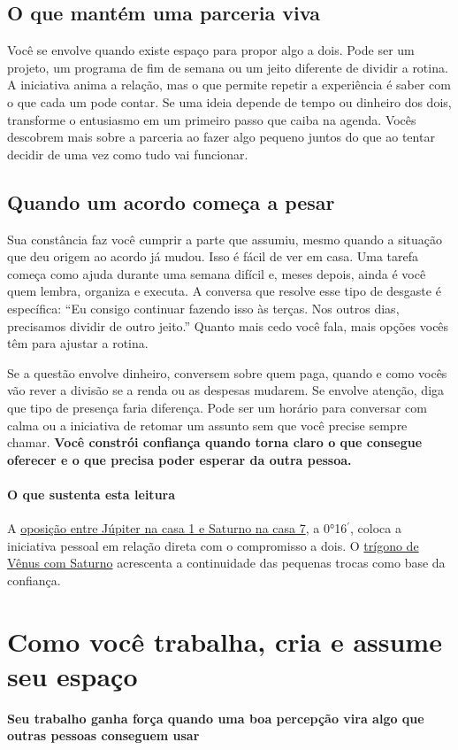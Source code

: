 \documentclass[11pt,a4paper]{article}
\newcommand{\subtituloleitura}[1]{\textbf{#1}\par\nopagebreak[4]}
\begin{document}
\subsection*{O que mantém uma parceria viva}

Você se envolve quando existe espaço para propor algo a dois. Pode ser um projeto, um programa de fim de semana ou um jeito diferente de dividir a rotina. A iniciativa anima a relação, mas o que permite repetir a experiência é saber com o que cada um pode contar. Se uma ideia depende de tempo ou dinheiro dos dois, transforme o entusiasmo em um primeiro passo que caiba na agenda. Vocês descobrem mais sobre a parceria ao fazer algo pequeno juntos do que ao tentar decidir de uma vez como tudo vai funcionar.

\subsection*{Quando um acordo começa a pesar}

Sua constância faz você cumprir a parte que assumiu, mesmo quando a situação que deu origem ao acordo já mudou. Isso é fácil de ver em casa. Uma tarefa começa como ajuda durante uma semana difícil e, meses depois, ainda é você quem lembra, organiza e executa. A conversa que resolve esse tipo de desgaste é específica: “Eu consigo continuar fazendo isso às terças. Nos outros dias, precisamos dividir de outro jeito.” Quanto mais cedo você fala, mais opções vocês têm para ajustar a rotina.

Se a questão envolve dinheiro, conversem sobre quem paga, quando e como vocês vão rever a divisão se a renda ou as despesas mudarem. Se envolve atenção, diga que tipo de presença faria diferença. Pode ser um horário para conversar com calma ou a iniciativa de retomar um assunto sem que você precise sempre chamar. \textbf{Você constrói confiança quando torna claro o que consegue oferecer e o que precisa poder esperar da outra pessoa.}

\paragraph*{O que sustenta esta leitura} A \hyperref[aspecto:jupiter-saturno]{oposição entre Júpiter na casa 1 e Saturno na casa 7}, a 0°16\ensuremath{^{\prime}}, coloca a iniciativa pessoal em relação direta com o compromisso a dois. O \hyperref[aspecto:venus-saturno]{trígono de Vênus com Saturno} acrescenta a continuidade das pequenas trocas como base da confiança.
\clearpage
\section{Como você trabalha, cria e assume seu espaço}
\subtituloleitura{Seu trabalho ganha força quando uma boa percepção vira algo que outras pessoas conseguem usar}
\end{document}
